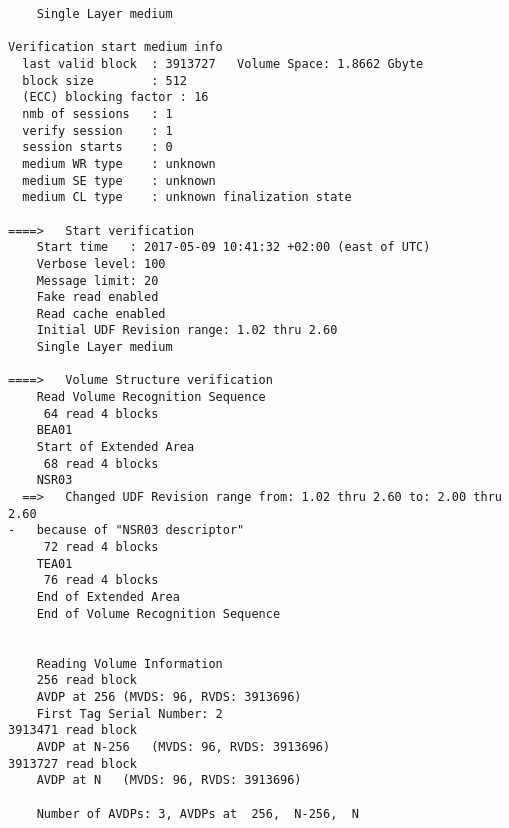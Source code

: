 \begin{lstlisting}
    Single Layer medium

Verification start medium info
  last valid block  : 3913727   Volume Space: 1.8662 Gbyte
  block size        : 512
  (ECC) blocking factor : 16
  nmb of sessions   : 1
  verify session    : 1
  session starts    : 0       
  medium WR type    : unknown
  medium SE type    : unknown
  medium CL type    : unknown finalization state

====>   Start verification
    Start time   : 2017-05-09 10:41:32 +02:00 (east of UTC)
    Verbose level: 100
    Message limit: 20
    Fake read enabled
    Read cache enabled
    Initial UDF Revision range: 1.02 thru 2.60
    Single Layer medium

====>   Volume Structure verification
    Read Volume Recognition Sequence
     64 read 4 blocks
    BEA01
    Start of Extended Area
     68 read 4 blocks
    NSR03
  ==>   Changed UDF Revision range from: 1.02 thru 2.60 to: 2.00 thru 2.60
-   because of "NSR03 descriptor"
     72 read 4 blocks
    TEA01
     76 read 4 blocks
    End of Extended Area
    End of Volume Recognition Sequence


    Reading Volume Information
    256 read block
    AVDP at 256 (MVDS: 96, RVDS: 3913696)
    First Tag Serial Number: 2
3913471 read block
    AVDP at N-256   (MVDS: 96, RVDS: 3913696)
3913727 read block
    AVDP at N   (MVDS: 96, RVDS: 3913696)

    Number of AVDPs: 3, AVDPs at  256,  N-256,  N


\end{lstlisting}
